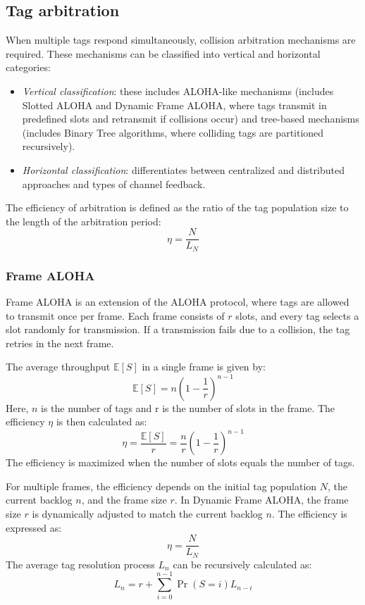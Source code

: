 \subsection{Tag arbitration}
When multiple tags respond simultaneously, collision arbitration mechanisms are required. These mechanisms can be classified into vertical and horizontal categories:
\begin{itemize}
    \item \textit{Vertical classification}: these includes ALOHA-like mechanisms (includes Slotted ALOHA and Dynamic Frame ALOHA, where tags transmit in predefined slots and retransmit if collisions occur) and tree-based mechanisms (includes Binary Tree algorithms, where colliding tags are partitioned recursively).
    \item \textit{Horizontal classification}: differentiates between centralized and distributed approaches and types of channel feedback.
\end{itemize}
\noindent The efficiency of arbitration is defined as the ratio of the tag population size to the length of the arbitration period:
\[\eta=\dfrac{N}{L_N}\]

\subsubsection{Frame ALOHA}
Frame ALOHA is an extension of the ALOHA protocol, where tags are allowed to transmit once per frame. 
Each frame consists of $r$ slots, and every tag selects a slot randomly for transmission. 
If a transmission fails due to a collision, the tag retries in the next frame.

The average throughput $\mathbb{E}[S]$ in a single frame is given by:
\[\mathbb{E}[S]=n\left(1-\dfrac{1}{r}\right)^{n-1}\]
\noindent Here, $n$ is the number of tags and r is the number of slots in the frame. 
The efficiency $\eta$ is then calculated as:
\[\eta=\dfrac{\mathbb{E}[S]}{r}=\dfrac{n}{r}\left(1-\dfrac{1}{r}\right)^{n-1}\]
\noindent The efficiency is maximized when the number of slots equals the number of tags. 

For multiple frames, the efficiency depends on the initial tag population $N$, the current backlog $n$, and the frame size $r$. 
In Dynamic Frame ALOHA, the frame size $r$ is dynamically adjusted to match the current backlog $n$. 
The efficiency is expressed as:
\[\eta=\dfrac{N}{L_N}\]
\noindent The average tag resolution process $L_n$ can be recursively calculated as:
\[L_n=r+\sum_{i=0}^{n-1}\Pr(S=i)L_{n-i}\]

